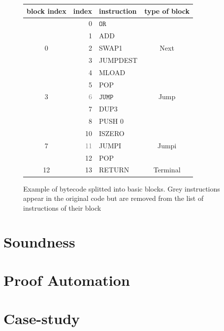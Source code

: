 \documentclass[sigplan,10pt,review]{acmart}\settopmatter{printfolios=true,printccs=false,printacmref=false}
\newcommand{\instr}[1]{\mathtt{#1}}
\begin{document}
\begin{figure}
\center
\begin{tabular}{c r l c}
                block index & index & instruction & type of block\\
                        \hline
                &       0       &       $\instr{OR}$&\\
                &       1       &       ADD&\\
                {0}&    2       &       SWAP1&  {Next}\\
                        \hline
                &       3       &       JUMPDEST&\\
                &       4       &       MLOAD&\\
                &       5       &       POP&\\
                {3}&    \textcolor{gray}{6}     &       {\color{gray}$\instr{JUMP}$}&     {Jump}\\
                        \hline
                &       7       &       DUP3&\\
                &       8       &       PUSH 0&\\
                &       10      &       ISZERO&\\
                {7}&    \textcolor{gray}{11}    &       {\color{gray}JUMPI}&    {Jumpi}\\
                        \hline
                &       12      &       POP&\\
                {12}&   13      &       RETURN& {Terminal}\\
                        \hline
        \end{tabular}
\caption{Example of bytecode splitted into basic blocks. Grey instructions appear in the original 
         code but are removed from the list of instructions of their block}
\label{fig:basicblocks}
\end{figure}

\section{Soundness}
\label{sec:sound}


\section{Proof Automation}
\label{sec:auto}


\section{Case-study}
\label{sec:case}
\end{document}
